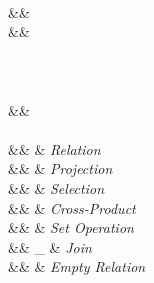 \begin{figure}
\begin{syntax}

 \\[1ex]
\bullet
  &\eqq&  \\
\circ
  &\eqq& \cup \myOR \cap \\[2ex]

 \\[1ex]
\cte \in {} \\[2ex]

 \\[1ex]
\pCond\in\pCondSet
  &\eqq&   \\[2ex]


 \\[1ex]
\pQ\in\pQSet
  &\eqq&  \pRel     & \textit{Relation}\\
  &\myOR& \pPrj[\pAttList]{\pQ} & \textit{Projection}\\
  &\myOR& \pSel\pQ & \textit{Selection}\\
  &\myOR& \pQ \times \pQ & \textit{Cross-Product}\\
  &\myOR& \pQ \circ \pQ  & \textit{Set Operation}\\
 &\myOR& \pQ \Join_{\pCond} \pQ & \textit{Join}\\
  &\myOR& \empRel & \textit{Empty Relation}





\end{syntax}
\end{figure}
